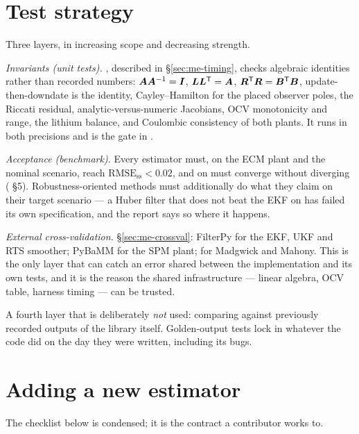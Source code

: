 \section{Test strategy}

Three layers, in increasing scope and decreasing strength.

\emph{Invariants (unit tests).} , described in \S\ref{sec:me-timing},
checks algebraic identities rather than recorded numbers: $\bm{A}\bm{A}^{-1}=\bm{I}$,
$\bm{L}\bm{L}^{\mathsf{T}}=\bm{A}$, $\bm{R}^{\mathsf{T}}\bm{R} = \bm{B}^{\mathsf{T}}\bm{B}$, update-then-downdate is the identity, Cayley--Hamilton
for the placed observer poles, the Riccati residual, analytic-versus-numeric Jacobians, OCV
monotonicity and range, the lithium balance, and Coulombic consistency of both plants. It runs in
both precisions and is the gate in .

\emph{Acceptance (benchmark).} Every estimator must, on the ECM plant and the nominal scenario,
reach $\text{RMSE}_{\text{ss}} < 0.02$, and on  must converge without diverging
( \S5). Robustness-oriented methods must additionally do what they
claim on their target scenario --- a Huber filter that does not beat the EKF on  has
failed its own specification, and the report says so where it happens.

\emph{External cross-validation.} \S\ref{sec:me-crossval}: FilterPy for the EKF, UKF and RTS
smoother; PyBaMM for the SPM plant;  for Madgwick and Mahony. This is the only layer
that can catch an error shared between the implementation and its own tests, and it is the reason
the shared infrastructure --- linear algebra, OCV table, harness timing --- can be trusted.

A fourth layer that is deliberately \emph{not} used: comparing against previously recorded outputs
of the library itself. Golden-output tests lock in whatever the code did on the day they were
written, including its bugs.

\section{Adding a new estimator}
\label{sec:lib-newest}

The checklist below is  condensed; it is the contract a contributor
works to.

